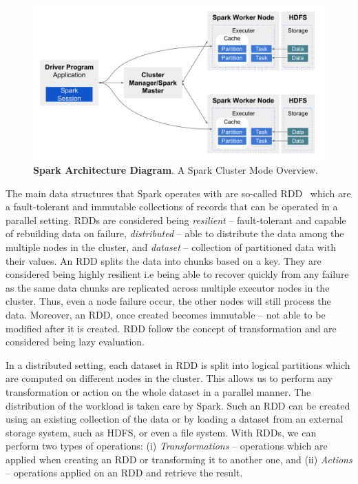 \begin{figure}
\centering
\includegraphics[width=1.0\columnwidth]{images/2_preliminaries/spark-dataflow.pdf}
 \caption{\textbf{Spark Architecture Diagram}. A Spark Cluster Mode Overview.}
\label{fig:preliminaries-spark-dataflow}
\end{figure}

The main data structures that Spark operates with are so-called \gls{RDD}~\cite{zaharia2012resilient} which are a fault-tolerant and immutable collections of records that can be operated in a parallel setting.
\gls{RDD}s are considered being \textit{resilient} -- fault-tolerant and capable of rebuilding data on failure, \textit{distributed} -- able to distribute the data among the multiple nodes in the cluster, and \textit{dataset} -- collection of partitioned data with their values.
An \gls{RDD} splits the data into chunks based on a key. 
They are considered being highly resilient i.e being able to recover quickly from any failure as the same data chunks are replicated across multiple executor nodes in the cluster.
Thus, even a node failure occur, the other nodes will still process the data.
Moreover, an RDD, once created becomes immutable -- not able to be modified after it is created.
RDD follow the concept of transformation and are considered being lazy evaluation.

In a distributed setting, each dataset in \gls{RDD} is split into logical partitions which are computed on different nodes in the cluster.
This allows us to perform any transformation or action on the whole dataset in a parallel manner.
The distribution of the workload is taken care by Spark.
Such an \gls{RDD} can be created using an existing collection of the data or by loading a dataset from an external storage system, such as \gls{HDFS}, or even a file system.
With \gls{RDD}s, we can perform two types of operations: (i) \textit{Transformations} -- operations which are applied when creating an \gls{RDD} or transforming it to another one, and (ii) \textit{Actions} -- operations applied on an \gls{RDD} and retrieve the result.

